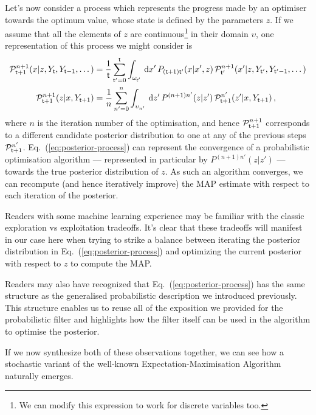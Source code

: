 Let's now consider a process which represents the progress made by an optimiser towards the optimum value, whose state is defined by the parameters $z$. If we assume that all the elements of $z$ are continuous\footnote{We can modify this expression to work for discrete variables too.} in their domain $\upsilon$, one representation of this process we might consider is
\begin{align}
{\cal P}^{n+1}_{{\sf t}+1}(x\vert z, Y_{{\sf t}}, Y_{{\sf t}-1}, \dots) &= \frac{1}{{\sf t}}\sum_{{\sf t}'=0}^{{\sf t}}\int_{\omega_{{\sf t}'}} \,{\rm d}x' \, P_{({\sf t}+1){\sf t}'}(x\vert x',z)\, {\cal P}^{n+1}_{{\sf t}'}(x'\vert z, Y_{{\sf t}'}, Y_{{\sf t}'-1}, \dots) \\
{\cal P}^{n+1}_{{\sf t}+1}(z \vert x, Y_{{\sf t}+1}) &= \frac{1}{n}\sum_{n'=0}^n\int_{\upsilon_{n'}} \,{\rm d}z' \, P^{(n+1)n'}(z\vert z')\, {\cal P}^{n'}_{{\sf t}+1}(z'\vert x, Y_{{\sf t}+1}) \label{eq:posterior-process} \,,
\end{align}
where $n$ is the iteration number of the optimisation, and hence ${\cal P}^{n+1}_{{\sf t}+1}$ corresponds to a different candidate posterior distribution to one at any of the previous steps ${\cal P}^{n'}_{{\sf t}+1}$. Eq.~(\ref{eq:posterior-process}) can represent the convergence of a probabilistic optimisation algorithm --- represented in particular by $P^{(n+1)n'}(z\vert z')$ --- towards the true posterior distribution of $z$. As such an algorithm converges, we can recompute (and hence iteratively improve) the MAP estimate with respect to each iteration of the posterior.

Readers with some machine learning experience may be familiar with the classic exploration vs exploitation tradeoffs. It's clear that these tradeoffs will manifest in our case here when trying to strike a balance between iterating the posterior distribution in Eq.~(\ref{eq:posterior-process}) and optimizing the current posterior with respect to $z$ to compute the MAP. 

Readers may also have recognized that Eq.~(\ref{eq:posterior-process}) has the same structure as the generalised probabilistic description we introduced previously. This structure enables us to reuse all of the exposition we provided for the probabilistic filter and highlights how the filter itself can be used in the algorithm to optimise the posterior.   

If we now synthesize both of these observations together, we can see how a stochastic variant of the well-known Expectation-Maximisation Algorithm~\cite{hartley1958maximum, dempster1977maximum, murphy2012machine} naturally emerges.

